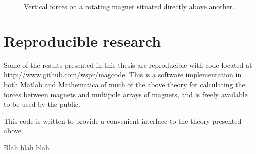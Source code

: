 \begin{figure}
  \centering
  \caption{Vertical forces on a rotating magnet situated directly above another.}
\end{figure}



\section{Reproducible research}

Some of the results presented in this thesis are reproducible \parencite{kovacevic2007-icassp} with code located at \url{http://www.github.com/wspr/magcode}. This is a software implementation in both Matlab and Mathematica  of much of the above theory for calculating the forces between magnets and multipole arrays of magnets, and is freely available to be used by the public.

This code is written to provide a convenient interface to the theory presented above.

Blah blah blah.

